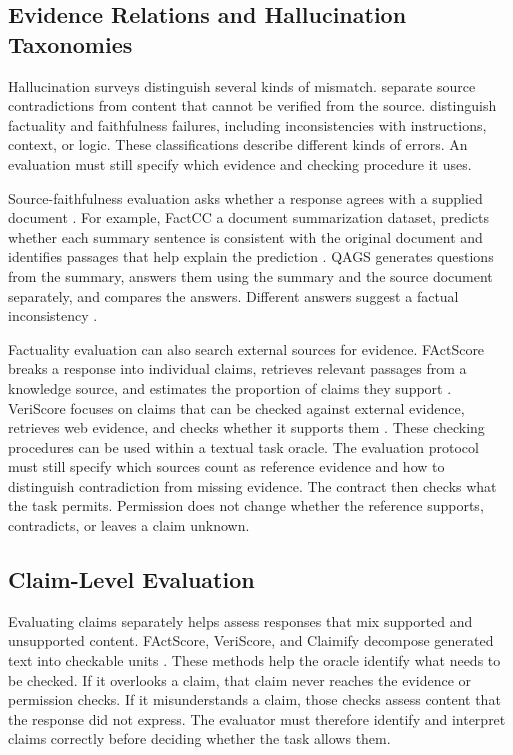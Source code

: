 \documentclass{clv2025}
\begin{document}
\subsection{Evidence Relations and Hallucination Taxonomies}

Hallucination surveys distinguish several kinds of mismatch.
\citet{ji_survey_2023} separate source contradictions from content that cannot
be verified from the source. \citet{huang_survey_2025} distinguish factuality
and faithfulness failures, including inconsistencies with instructions,
context, or logic. These classifications describe different kinds of errors.
An evaluation must still specify which evidence and checking procedure it uses.

Source-faithfulness evaluation asks whether a response agrees with a supplied
document \citep{maynez_faithfulness_2020}. For example, FactCC \citep{kryscinski_evaluating_2020} a document summarization dataset, predicts whether
each summary sentence is consistent with the original document and identifies
passages that help explain the prediction .
QAGS generates questions from the summary, answers them using the summary
and the source document separately, and compares the answers. Different
answers suggest a factual inconsistency \citep{wang_asking_2020}.

Factuality evaluation can also search external sources for evidence.
FActScore breaks a response into individual claims, retrieves relevant
passages from a knowledge source, and estimates the proportion of claims
they support \citep{min_factscore_2023}. VeriScore focuses on claims that
can be checked against external evidence, retrieves web evidence, and
checks whether it supports them \citep{song_veriscore_2024}.
These checking procedures can be used within a textual task oracle.
The evaluation protocol must still specify which sources count as reference
evidence and how to distinguish contradiction from missing evidence.
The contract then checks what the task permits. Permission does not change
whether the reference supports, contradicts, or leaves a claim unknown.

\subsection{Claim-Level Evaluation}\label{subsec:extraction}

Evaluating claims separately helps assess responses that mix supported and
unsupported content.
FActScore, VeriScore, and Claimify decompose generated text into checkable units
\citep{min_factscore_2023,song_veriscore_2024,metropolitansky_claimify_2025}.
These methods help the oracle identify what needs to be checked. If it
overlooks a claim, that claim never reaches the evidence or permission
checks. If it misunderstands a claim, those checks assess content that the
response did not express. The evaluator must therefore identify and
interpret claims correctly before deciding whether the task allows them.
\end{document}
